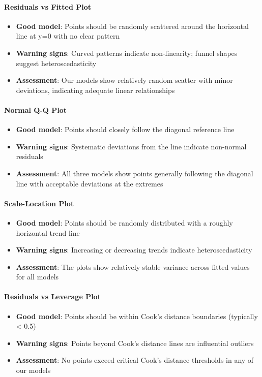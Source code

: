 \paragraph{Residuals vs Fitted Plot}
\begin{itemize}
    \item \textbf{Good model}: Points should be randomly scattered around the horizontal line at y=0 with no clear pattern
    \item \textbf{Warning signs}: Curved patterns indicate non-linearity; funnel shapes suggest heteroscedasticity
    \item \textbf{Assessment}: Our models show relatively random scatter with minor deviations, indicating adequate linear relationships
\end{itemize}

\paragraph{Normal Q-Q Plot}
\begin{itemize}
    \item \textbf{Good model}: Points should closely follow the diagonal reference line
    \item \textbf{Warning signs}: Systematic deviations from the line indicate non-normal residuals
    \item \textbf{Assessment}: All three models show points generally following the diagonal line with acceptable deviations at the extremes
\end{itemize}

\paragraph{Scale-Location Plot}
\begin{itemize}
    \item \textbf{Good model}: Points should be randomly distributed with a roughly horizontal trend line
    \item \textbf{Warning signs}: Increasing or decreasing trends indicate heteroscedasticity
    \item \textbf{Assessment}: The plots show relatively stable variance across fitted values for all models
\end{itemize}

\paragraph{Residuals vs Leverage Plot}
\begin{itemize}
    \item \textbf{Good model}: Points should be within Cook's distance boundaries (typically < 0.5)
    \item \textbf{Warning signs}: Points beyond Cook's distance lines are influential outliers
    \item \textbf{Assessment}: No points exceed critical Cook's distance thresholds in any of our models
\end{itemize}

